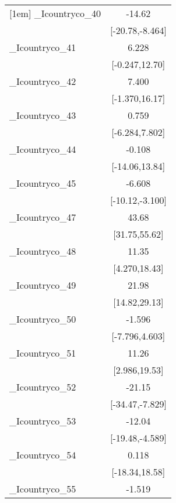 {\begin{tabular}{l*{1}{c}}
[1em]
\_Icountryco\_40&                -14.62\sym{***}\\
            &       [-20.78,-8.464]         \\
[1em]
\_Icountryco\_41&                 6.228         \\
            &        [-0.247,12.70]         \\
[1em]
\_Icountryco\_42&                 7.400         \\
            &        [-1.370,16.17]         \\
[1em]
\_Icountryco\_43&                 0.759         \\
            &        [-6.284,7.802]         \\
[1em]
\_Icountryco\_44&                -0.108         \\
            &        [-14.06,13.84]         \\
[1em]
\_Icountryco\_45&                -6.608\sym{***}\\
            &       [-10.12,-3.100]         \\
[1em]
\_Icountryco\_47&                 43.68\sym{***}\\
            &         [31.75,55.62]         \\
[1em]
\_Icountryco\_48&                 11.35\sym{**} \\
            &         [4.270,18.43]         \\
[1em]
\_Icountryco\_49&                 21.98\sym{***}\\
            &         [14.82,29.13]         \\
[1em]
\_Icountryco\_50&                -1.596         \\
            &        [-7.796,4.603]         \\
[1em]
\_Icountryco\_51&                 11.26\sym{**} \\
            &         [2.986,19.53]         \\
[1em]
\_Icountryco\_52&                -21.15\sym{**} \\
            &       [-34.47,-7.829]         \\
[1em]
\_Icountryco\_53&                -12.04\sym{**} \\
            &       [-19.48,-4.589]         \\
[1em]
\_Icountryco\_54&                 0.118         \\
            &        [-18.34,18.58]         \\
[1em]
\_Icountryco\_55&                -1.519         \\

\end{tabular}}

